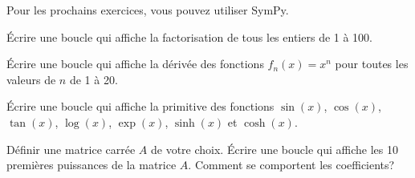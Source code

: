 Pour les prochains exercices, vous pouvez utiliser SymPy.

\begin{exercice}
    Écrire une boucle qui affiche la factorisation de tous les entiers de 1 à
    100.
\end{exercice}

\begin{exercice}
    Écrire une boucle qui affiche la dérivée des fonctions $f_n(x)=x^n$ pour
    toutes les valeurs de $n$ de 1 à 20.
\end{exercice}

\begin{exercice}
    Écrire une boucle qui affiche la primitive des fonctions $\sin(x)$,
    $\cos(x)$, $\tan(x)$, $\log(x)$, $\exp(x)$, $\sinh(x)$ et $\cosh(x)$.
\end{exercice}

\begin{exercice}
    Définir une matrice carrée $A$ de votre choix. Écrire une boucle qui
    affiche les 10 premières puissances de la matrice $A$. Comment se
    comportent les coefficients?
\end{exercice}



